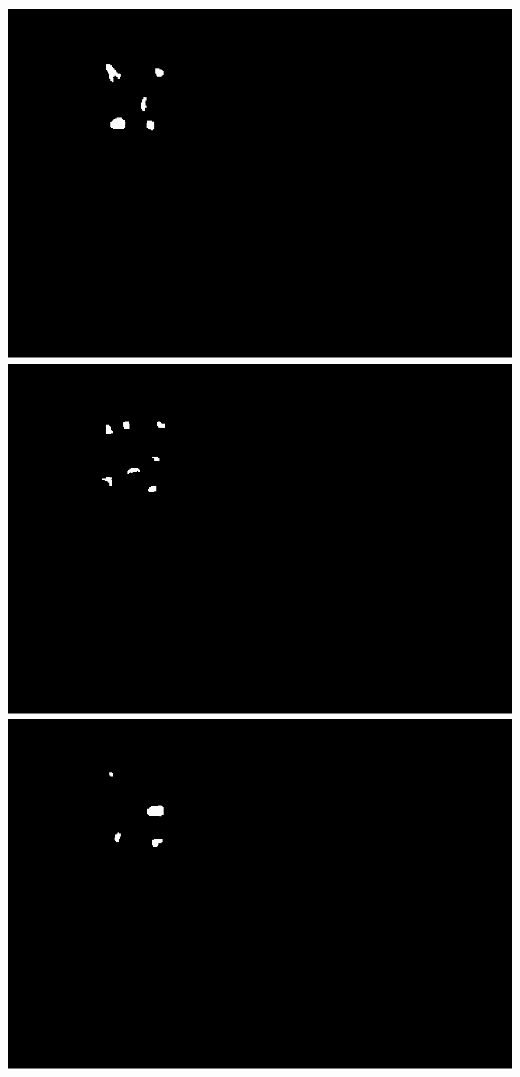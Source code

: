 \documentclass[]{article}
\begin{document}
\includegraphics{tapas-vignette_files/figure-latex/unnamed-chunk-9-4.pdf}
\includegraphics{tapas-vignette_files/figure-latex/unnamed-chunk-9-5.pdf}
\includegraphics{tapas-vignette_files/figure-latex/unnamed-chunk-9-6.pdf}
\end{document}
